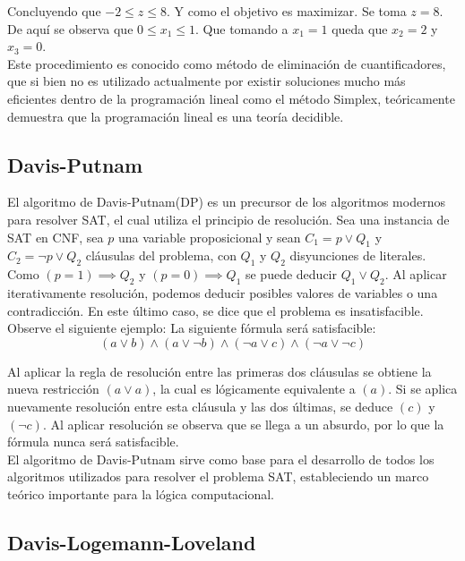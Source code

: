 \documentclass[12pt]{report}
\begin{document}
Concluyendo que $-2\leq  z \leq  8$. Y como el objetivo es maximizar. Se toma $z=8$. De aquí se observa que $0\leq  x_1 \leq 1$. Que tomando a $x_1=1$ queda que $x_2=2$ y $x_3 = 0$.\\

Este procedimiento es conocido como método de eliminación de cuantificadores, que si bien no es utilizado actualmente por existir soluciones mucho más eficientes dentro de la programación lineal como el método Simplex, teóricamente demuestra que la programación lineal es una teoría decidible.

\subsection{Davis-Putnam}

El algoritmo de Davis-Putnam(DP) es un precursor de los algoritmos modernos para resolver SAT, el cual utiliza el principio de resolución. Sea una instancia de SAT en CNF, sea $p$ una variable proposicional y sean $C_1=p \lor  Q_1$  y  $C_2 = \neg p \lor  Q_2$ cláusulas del problema, con $Q_1$ y $Q_2$ disyunciones de literales. Como $(p=1)\implies  Q_2$ y $(p=0)\implies  Q_1$ se puede deducir $Q_1\lor  Q_2$. Al aplicar iterativamente resolución, podemos deducir posibles valores de variables o una contradicción. En este último caso, se dice que el problema es insatisfacible.\\ 

Observe el siguiente ejemplo: La siguiente fórmula será satisfacible:
$$(a\lor  b) \land(a\lor  \neg b) \land (\neg a\lor  c) \land(\neg a\lor  \neg c)$$

Al aplicar la regla de resolución entre las primeras dos cláusulas se obtiene la nueva restricción $(a \lor  a)$, la cual es lógicamente equivalente a $(a)$. Si se aplica nuevamente resolución entre esta cláusula y las dos últimas, se deduce $(c)$ y $(\neg c)$. Al aplicar resolución se observa que se llega a un absurdo, por lo que la fórmula nunca será satisfacible. \\

El algoritmo de Davis-Putnam sirve como base para el desarrollo de todos los algoritmos utilizados para resolver el problema SAT, estableciendo un marco teórico importante para la lógica computacional.


\subsection{Davis-Logemann-Loveland}
\end{document}
